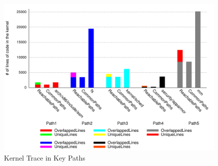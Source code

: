 \begin{figure}%
\centering
\includegraphics[width=1.0\columnwidth]{diagram/lind_ccs15_diagram_02.pdf}
\caption{Kernel Trace in Key Paths}
\label{fig:key_paths_trace}
\end{figure}

